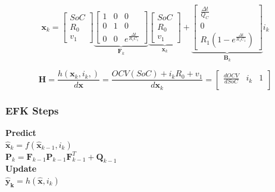 \begin{equation}
 \boldsymbol x_k = 
  \begin{bmatrix}
  SoC \\
  R_0 \\
  v_1
  \end{bmatrix}   
 \underbrace{  
 \begin{bmatrix}
 1 & 0 & 0\\
 0 & 1 & 0\\
 0 & 0 & e^\frac{\Delta t}{R_1 C_1}
 \end{bmatrix}}_{\boldsymbol F_k}
 \underbrace{ 
 \begin{bmatrix}
 SoC \\
 R_0 \\
 v_1
 \end{bmatrix}}_{\boldsymbol x_k}  
 +
 \underbrace{
 \begin{bmatrix}
 \frac{\Delta t}{Q_C} \\
 0 \\
 R_1 (1-e^\frac{\Delta t}{R_1 C_1})
 \end{bmatrix}}_{\boldsymbol B_k}  i_k  
\end{equation}

\begin{equation}
\boldsymbol H = \frac{h({\boldsymbol {x}}_{k}, {i}_{k},)} {d \boldsymbol {x}}  =  \frac{OCV(SoC) + i_k R_0  +  v_1}{d\boldsymbol {x}_{k}} = 
\begin{bmatrix}
 \frac{dOCV}{dSoC} &  i_k  & 1\\
\end{bmatrix}
\end{equation}


\subsubsection{EFK Steps}

\textbf{Predict} \\

$\hat{\boldsymbol x}_k = f( \hat{\boldsymbol x}_{k-1}, {i}_{k})$ \\


$\boldsymbol P_k = \boldsymbol F_{k-1} \boldsymbol P_{k-1} \boldsymbol F^T_{k-1} + \boldsymbol Q_{k-1}$ \\

\textbf{Update} \\ 

$\boldsymbol {\hat{y}_k} = h( \hat{\boldsymbol x},i_k) $ %


